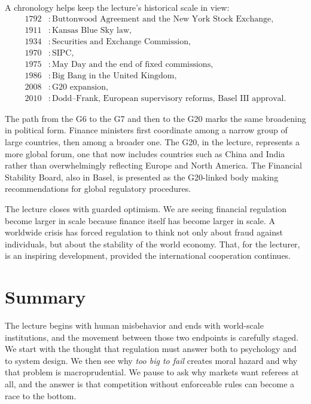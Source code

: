A chronology helps keep the lecture's historical scale in view:
\begin{align}
1792 &: \text{Buttonwood Agreement and the New York Stock Exchange},\\
1911 &: \text{Kansas Blue Sky law},\\
1934 &: \text{Securities and Exchange Commission},\\
1970 &: \text{SIPC},\\
1975 &: \text{May Day and the end of fixed commissions},\\
1986 &: \text{Big Bang in the United Kingdom},\\
2008 &: \text{G20 expansion},\\
2010 &: \text{Dodd--Frank, European supervisory reforms, Basel III approval}.
\end{align}

The path from the G6 to the G7 and then to the G20 marks the same broadening in political form. Finance ministers first coordinate among a narrow group of large countries, then among a broader one. The G20, in the lecture, represents a more global forum, one that now includes countries such as China and India rather than overwhelmingly reflecting Europe and North America. The Financial Stability Board, also in Basel, is presented as the G20-linked body making recommendations for global regulatory procedures.

The lecture closes with guarded optimism. We are seeing financial regulation become larger in scale because finance itself has become larger in scale. A worldwide crisis has forced regulation to think not only about fraud against individuals, but about the stability of the world economy. That, for the lecturer, is an inspiring development, provided the international cooperation continues.

\section{Summary}

The lecture begins with human misbehavior and ends with world-scale institutions, and the movement between those two endpoints is carefully staged. We start with the thought that regulation must answer both to psychology and to system design. We then see why \emph{too big to fail} creates moral hazard and why that problem is macroprudential. We pause to ask why markets want referees at all, and the answer is that competition without enforceable rules can become a race to the bottom.

